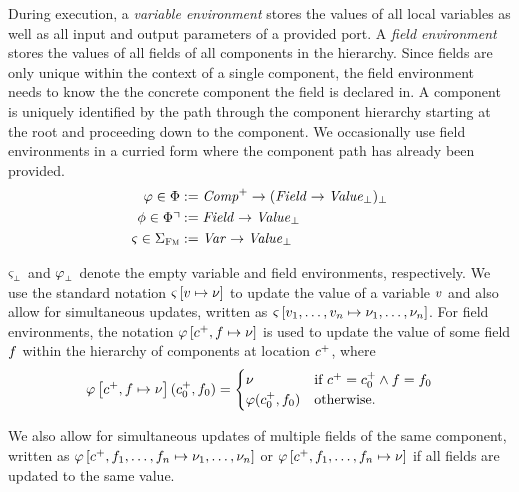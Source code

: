 \documentclass[a4paper,10pt,english]{article}
\begin{document}
During execution, a \textit{variable environment} stores the values of all local variables as well as all input and output
parameters of a provided port.
A \textit{field environment} stores the values of all fields of all components in the hierarchy. Since fields are only unique
within the context of a single component, the field environment needs to know the the concrete component the field is declared
in. A component is uniquely identified by the path through the component hierarchy starting at the root and proceeding down to the
component. We occasionally use field environments in a curried form where the component path has already been provided.
\begin{align*}
	\varphi \in \Phi &:= \mathit{Comp}^+ \rightarrow (\mathit{Field} \rightarrow \mathit{Value}_\bot)_\bot \\
	\phi \in \Phi\urcorner &:= \mathit{Field} \rightarrow \mathit{Value}_\bot \\
	\varsigma \in \Sigma_\textsc{Fm} &:= \mathit{Var} \rightarrow \mathit{Value}_\bot
\end{align*}

$\varsigma_{{}_\bot}$ and $\varphi_{{}_\bot}$ denote the empty variable and field environments, respectively. We use the standard
notation $\varsigma\left[v \mapsto \nu \right]$ to update the value of a variable $v$ and also allow for simultaneous
updates, written as $\varsigma\left[v_1, \ldots, v_n \mapsto \nu_1, \ldots, \nu_n\right]$.
For field environments, the notation $\varphi\left[c^+, f \mapsto \nu \right]$ is used to update the value of
some field $f$ within the hierarchy of components at location $c^+$, where
\begin{equation*}
	\varphi\left[c^+, f \mapsto \nu \right](c^+_0, f_0) =
		\begin{cases}
			\nu & \text{if } c^+ = c^+_0 \wedge f = f_0 \\
			\varphi(c^+_0, f_0) & \text{otherwise.}
		\end{cases}
\end{equation*}

We also allow for simultaneous updates of multiple fields of the same component, written as $\varphi\left[c^+,
f_1, \ldots, f_n \mapsto \nu_1, \ldots, \nu_n \right]$ or $\varphi\left[c^+, f_1, \ldots, f_n
\mapsto \nu \right]$ if all fields are updated to the same value.
\end{document}
